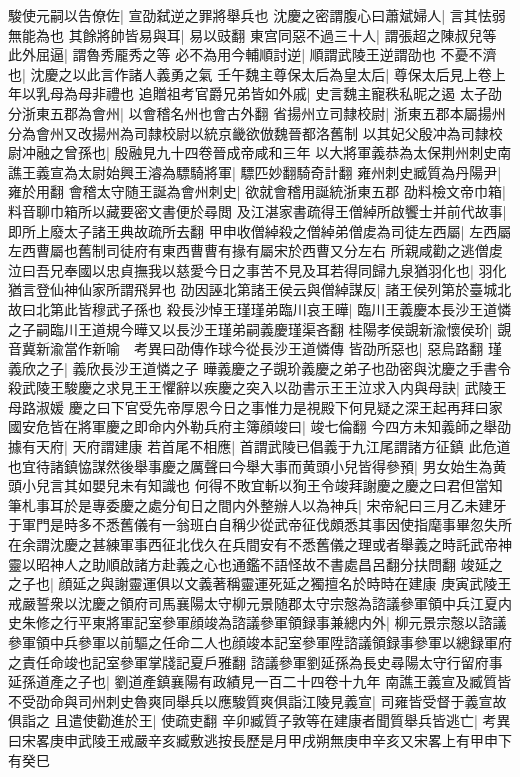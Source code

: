 駿使元嗣以告僚佐|{
	宣劭弑逆之罪將舉兵也}
沈慶之密謂腹心曰蕭斌婦人|{
	言其怯弱無能為也}
其餘將帥皆易與耳|{
	易以豉翻}
東宫同惡不過三十人|{
	謂張超之陳叔兒等}
此外屈逼|{
	謂魯秀龎秀之等}
必不為用今輔順討逆|{
	順謂武陵王逆謂劭也}
不憂不濟也|{
	沈慶之以此言作諸人義勇之氣}
壬午魏主尊保太后為皇太后|{
	尊保太后見上卷上年以乳母為母非禮也}
追贈祖考官爵兄弟皆如外戚|{
	史言魏主寵秩私昵之遏}
太子劭分浙東五郡為會州|{
	以會稽名州也會古外翻}
省揚州立司隸校尉|{
	浙東五郡本屬揚州分為會州又改揚州為司隸校尉以統京畿欲倣魏晉都洛舊制}
以其妃父殷冲為司隸校尉冲融之曾孫也|{
	殷融見九十四卷晉成帝咸和三年}
以大將軍義恭為太保荆州刺史南譙王義宣為太尉始興王濬為驃騎將軍|{
	驃匹妙翻騎奇計翻}
雍州刺史臧質為丹陽尹|{
	雍於用翻}
會稽太守随王誕為會州刺史|{
	欲就會稽用誕統浙東五郡}
劭料檢文帝巾箱|{
	料音聊巾箱所以藏要密文書便於尋閲}
及江湛家書疏得王僧綽所啟饗士并前代故事|{
	即所上廢太子諸王典故疏所去翻}
甲申收僧綽殺之僧綽弟僧䖍為司徒左西屬|{
	左西屬左西曹屬也舊制司徒府有東西曹曹有掾有屬宋於西曹又分左右}
所親咸勸之逃僧䖍泣曰吾兄奉國以忠貞撫我以慈愛今日之事苦不見及耳若得同歸九泉猶羽化也|{
	羽化猶言登仙神仙家所謂飛昇也}
劭因誣北第諸王侯云與僧綽謀反|{
	諸王侯列第於臺城北故曰北第此皆穆武子孫也}
殺長沙悼王瑾瑾弟臨川哀王曄|{
	臨川王義慶本長沙王道憐之子嗣臨川王道規今曄又以長沙王瑾弟嗣義慶瑾渠吝翻}
桂陽孝侯覬新渝懷侯玠|{
	覬音冀新渝當作新喻　考異曰劭傳作球今從長沙王道憐傳}
皆劭所惡也|{
	惡烏路翻}
瑾義欣之子|{
	義欣長沙王道憐之子}
曄義慶之子覬玠義慶之弟子也劭密與沈慶之手書令殺武陵王駿慶之求見王王懼辭以疾慶之突入以劭書示王王泣求入内與母訣|{
	武陵王母路淑媛}
慶之曰下官受先帝厚恩今日之事惟力是視殿下何見疑之深王起再拜曰家國安危皆在將軍慶之即命内外勒兵府主簿顔竣曰|{
	竣七倫翻}
今四方未知義師之舉劭據有天府|{
	天府謂建康}
若首尾不相應|{
	首謂武陵已倡義于九江尾謂諸方征鎮}
此危道也宜待諸鎮恊謀然後舉事慶之厲聲曰今舉大事而黄頭小兒皆得參預|{
	男女始生為黄頭小兒言其如嬰兒未有知識也}
何得不敗宜斬以狥王令竣拜謝慶之慶之曰君但當知筆札事耳於是專委慶之處分旬日之間内外整辦人以為神兵|{
	宋帝紀曰三月乙未建牙于軍門是時多不悉舊儀有一翁班白自稱少從武帝征伐頗悉其事因使指麾事畢忽失所在余謂沈慶之甚練軍事西征北伐久在兵間安有不悉舊儀之理或者舉義之時託武帝神靈以昭神人之助順啟諸方赴義之心也通鑑不語怪故不書處昌呂翻分扶問翻}
竣延之之子也|{
	顔延之與謝靈運俱以文義著稱靈運死延之獨擅名於時時在建康}
庚寅武陵王戒嚴誓衆以沈慶之領府司馬襄陽太守柳元景随郡太守宗慤為諮議參軍領中兵江夏内史朱修之行平東將軍記室參軍顔竣為諮議參軍領録事兼總内外|{
	柳元景宗慤以諮議參軍領中兵參軍以前驅之任命二人也顔竣本記室參軍陞諮議領録事參軍以總録軍府之責任命竣也記室參軍掌牋記夏戶雅翻}
諮議參軍劉延孫為長史尋陽太守行留府事延孫道產之子也|{
	劉道產鎮襄陽有政績見一百二十四卷十九年}
南譙王義宣及臧質皆不受劭命與司州刺史魯爽同舉兵以應駿質爽俱詣江陵見義宣|{
	司雍皆受督于義宣故俱詣之}
且遣使勸進於王|{
	使疏吏翻}
辛卯臧質子敦等在建康者聞質舉兵皆逃亡|{
	考異曰宋畧庚申武陵王戒嚴辛亥臧敷逃按長歷是月甲戌朔無庚申辛亥又宋畧上有甲申下有癸巳}


